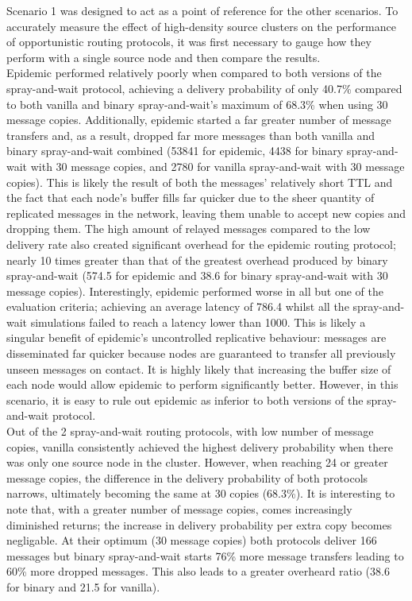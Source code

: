 \documentclass{article}
\begin{document}
\vspace{16px}
\noindent Scenario 1 was designed to act as a point of reference for the other scenarios. To accurately measure the effect of high-density source clusters on the performance of opportunistic routing protocols, it was first necessary to gauge how they perform with a single source node and then compare the results.\\
\newline Epidemic performed relatively poorly when compared to both versions of the spray-and-wait protocol, achieving a delivery probability of only 40.7\% compared to both vanilla and binary spray-and-wait's maximum of 68.3\% when using 30 message copies. Additionally, epidemic started a far greater number of message transfers and, as a result, dropped far more messages than both vanilla and binary spray-and-wait combined (53841 for epidemic, 4438 for binary spray-and-wait with 30 message copies, and 2780 for vanilla spray-and-wait with 30 message copies). This is likely the result of both the messages' relatively short TTL and the fact that each node's buffer fills far quicker due to the sheer quantity of replicated messages in the network, leaving them unable to accept new copies and dropping them. The high amount of relayed messages compared to the low delivery rate also created significant overhead for the epidemic routing protocol; nearly 10 times greater than that of the greatest overhead produced by binary spray-and-wait (574.5 for epidemic and 38.6 for binary spray-and-wait with 30 message copies). Interestingly, epidemic performed worse in all but one of the evaluation criteria; achieving an average latency of 786.4 whilst all the spray-and-wait simulations failed to reach a latency lower than 1000. This is likely a singular benefit of epidemic's uncontrolled replicative behaviour: messages are disseminated far quicker because nodes are guaranteed to transfer all previously unseen messages on contact. It is highly likely that increasing the buffer size of each node would allow epidemic to perform significantly better. However, in this scenario, it is easy to rule out epidemic as inferior to both versions of the spray-and-wait protocol.\\
\newline Out of the 2 spray-and-wait routing protocols, with low number of message copies, vanilla consistently achieved the highest delivery probability when there was only one source node in the cluster. However, when reaching 24 or greater message copies, the difference in the delivery probability of both protocols narrows, ultimately becoming the same at 30 copies (68.3\%). It is interesting to note that, with a greater number of message copies, comes increasingly diminished returns; the increase in delivery probability per extra copy becomes negligable. At their optimum (30 message copies) both protocols deliver 166 messages but binary spray-and-wait starts 76\% more message transfers leading to 60\% more dropped messages. This also leads to a greater overheard ratio (38.6 for binary and 21.5 for vanilla).\\
\end{document}
